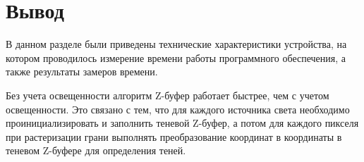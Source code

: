 
\clearpage


\section{Вывод}

В данном разделе были приведены технические характеристики устройства,
на котором проводилось измерение времени работы программного обеспечения, а
также результаты замеров времени.

Без учета освещенности алгоритм Z-буфер работает быстрее, чем с учетом освещенности.
Это связано с тем, что для каждого источника света необходимо проинициализировать
и заполнить теневой Z-буфер, а потом для каждого пикселя при растеризации
грани выполнять преобразование координат в координаты в теневом Z-буфере для
определения теней.


